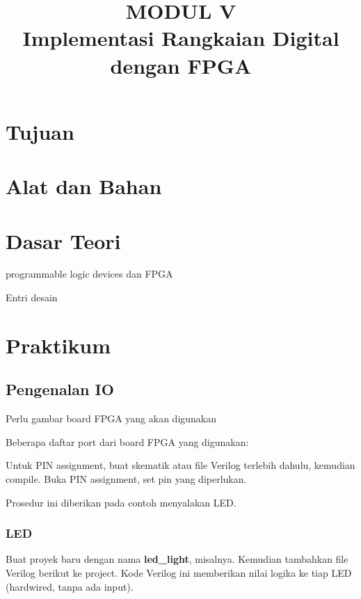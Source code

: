 \documentclass[a4paper,12pt,bahasa]{extarticle}
\begin{document}
\title{MODUL V \\
Implementasi Rangkaian Digital dengan FPGA}
\author{}
\date{}
\maketitle

\section{Tujuan}

\section{Alat dan Bahan}


\section{Dasar Teori}

programmable logic devices dan FPGA

Entri desain





\section{Praktikum}

\subsection{Pengenalan IO}

{\color{red} Perlu gambar board FPGA yang akan digunakan}

Beberapa daftar port dari board FPGA yang digunakan:



Untuk PIN assignment, buat skematik atau file Verilog terlebih dahulu, kemudian compile.
Buka PIN assignment, set pin yang diperlukan.

Prosedur ini diberikan pada contoh menyalakan LED.

\subsubsection{LED}

Buat proyek baru dengan nama \textbf{led\_light}, misalnya.
Kemudian tambahkan file Verilog berikut
ke project. Kode Verilog ini memberikan nilai logika ke tiap
LED (hardwired, tanpa ada input).
\end{document}
